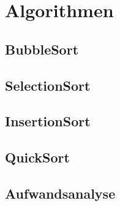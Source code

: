 \documentclass[./entry.tex]{subfiles}
\begin{document}
    \chapter{Algorithmen}
    \section{BubbleSort}
    
    \section{SelectionSort}
    
    \section{InsertionSort}
    
    \section{QuickSort}
    
    \section{Aufwandsanalyse}
    
\end{document}
